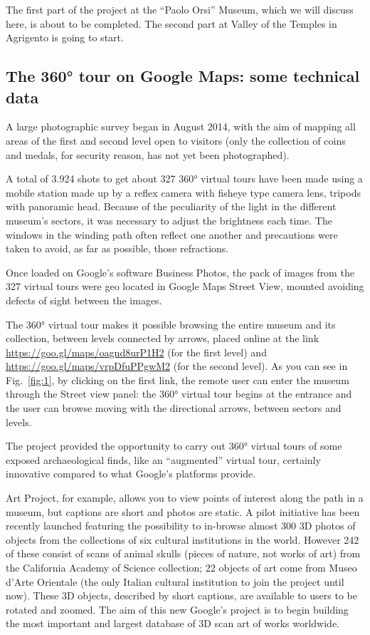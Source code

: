 \documentclass[amsthm,ebook]{saparticle}
\begin{document}
The first part of the project at the ``Paolo Orsi'' Museum, which we will discuss here, is about to be completed. The
second part at Valley of the Temples in Agrigento is going to start.




\subsection{The 360° tour on Google Maps: some technical data}


\noindent A large photographic survey began in August 2014, with the aim of mapping all areas of the first and second level open
to visitors (only the collection of coins and medals, for security reason, has not yet been photographed). 

A total of 3.924 shots to get about 327 360° virtual tours have been made using a mobile station made up by a reflex
camera with fisheye type camera lens, tripods with panoramic head. Because of the peculiarity of the light in the
different museum’s sectors, it was necessary to adjust the brightness each time. The windows in the winding path often
reflect one another and precautions were taken to avoid, as far as possible, those refractions.

Once loaded on Google’s software Business Photos, the pack of images from the 327 virtual tours were geo located in
Google Maps Street View, mounted avoiding defects of sight between the images. 

The 360° virtual tour makes it possible browsing the entire museum and its collection, between levels connected by
arrows, placed online at the link \url{https://goo.gl/maps/oagnd8urP1H2} (for the first level) and
\url{https://goo.gl/maps/vrpDfuPPgwM2} (for the second level). As you can see in Fig.~\ref{fig:1}, by clicking on the first link,
the remote user can enter the museum through the Street view panel: the 360° virtual tour begins at the entrance and
the user can browse moving with the directional arrows, between sectors and levels.

The project provided the opportunity to carry out 360° virtual tours of some exposed archaeological finds, like an
``augmented'' virtual tour, certainly innovative compared to what Google’s platforms provide. 

Art Project, for example, allows you to view points of interest along the path in a museum, but captions are short and
photos are static. A pilot initiative has been recently launched featuring the possibility to in-browse almost 300 3D
photos of objects from the collections of six cultural institutions in the world. However 242 of these consist of scans
of animal skulls (pieces of nature, not works of art) from the California Academy of Science collection; 22 objects of
art come from Museo d’Arte Orientale (the only Italian cultural institution to join the project until now). These 3D
objects, described by short captions, are available to users to be rotated and zoomed. The aim of this new Google’s
project is to begin building the most important and largest database of 3D scan art of works worldwide. 
\end{document}
